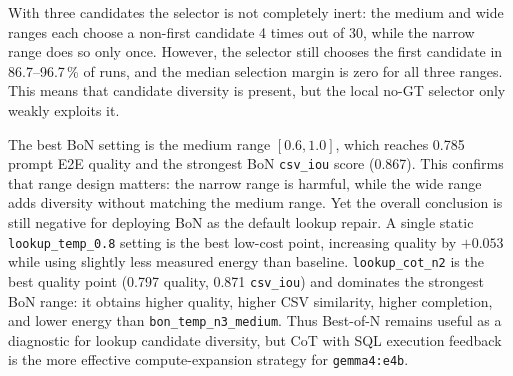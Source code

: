 \begin{table}[H]
\centering
{}
\caption{Test~04b: aggregate results per lookup strategy, \texttt{gemma4:e4b}.}
\label{tab:test04bresults}
\end{table}

With three candidates the selector is not completely
inert: the medium and wide ranges each choose a non-first candidate 4 times
out of 30, while the narrow range does so only once. However, the selector
still chooses the first candidate in 86.7--96.7\,\% of runs, and the median
selection margin is zero for all three ranges. This means that candidate
diversity is present, but the local no-GT selector only weakly exploits it.

The best BoN setting is the medium range $[0.6,1.0]$, which reaches 0.785
prompt E2E quality and the strongest BoN \texttt{csv\_iou} score (0.867). This confirms
that range design matters: the narrow range is harmful, while the wide range
adds diversity without matching the medium range. Yet the overall conclusion is
still negative for deploying BoN as the default lookup repair. A single static
\texttt{lookup\_temp\_0.8} setting is the best low-cost point, increasing
quality by $+0.053$ while using slightly less measured energy than baseline.
\texttt{lookup\_cot\_n2} is the best quality point (0.797 quality, 0.871
\texttt{csv\_iou}) and dominates the strongest BoN range: it obtains higher
quality, higher CSV similarity, higher completion, and lower energy than
\texttt{bon\_temp\_n3\_medium}. Thus Best-of-N remains useful as a diagnostic
for lookup candidate diversity, but CoT with SQL execution feedback is the
more effective compute-expansion strategy for \texttt{gemma4:e4b}.

